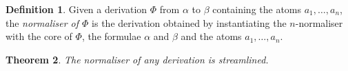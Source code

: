 \documentclass[a4paper]{amsart}
\newif\iflmcs\lmcsfalse %
\newtheorem{thm}{Theorem}[section]
\theoremstyle{remark}
\theoremstyle{definition}
\newtheorem{defi}[thm]{Definition}
\begin{document}
\begin{defi}
Given a derivation $\Phi$ from $\alpha$ to $\beta$ containing the atoms $a_1,\dots,a_n$, the \emph{normaliser of $\Phi$} is the derivation obtained by instantiating the $n$-normaliser with the core of $\Phi$, the formulae $\alpha$ and $\beta$ and the atoms $a_1,\dots,a_n$.
\end{defi}

\begin{thm}
The normaliser of any derivation is streamlined.
\end{thm}


%
% 
% 
\end{document}
